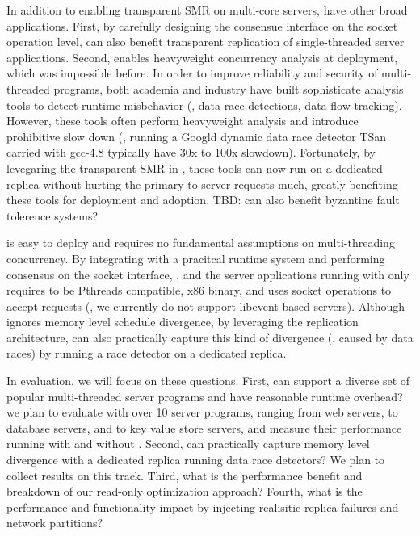 In addition to enabling transparent SMR on multi-core servers, \msmr have other 
broad applications. First, by carefully designing the consensue interface on 
the socket operation level, \msmr can also benefit transparent replication of 
single-threaded server applications. Second, \msmr enables heavyweight concurrency analysis at 
deployment, which was impossible before. In order to improve reliability and 
security of multi-threaded programs, both academia and industry have built 
sophisticate analysis tools to detect runtime misbehavior (\eg, data race detections, 
data flow tracking). However, these tools often perform heavyweight 
analysis and introduce prohibitive slow down (\eg, running a Googld dynamic data race detector 
TSan carried with gcc-4.8 typically have 30x to 100x slowdown). Fortunately, by 
levegaring the transparent SMR in \msmr, these tools can now run on a dedicated 
replica without hurting the primary to server requests much, greatly benefiting 
these tools for deployment and adoption. TBD: can \msmr also benefit byzantine fault 
tolerence systems?

\msmr is easy to deploy and requires no fundamental assumptions on multi-threading concurrency.
By integrating with a pracitcal \msmr runtime system \parrot and 
performing consensus on the socket interface, ,
and the server applications running with \msmr 
only requires to be Pthreads compatible, x86 binary, and uses socket operations 
to accept requests (\ie, we currently do not support libevent based servers). 
Although \parrot ignores memory level schedule divergence, by leveraging the replication architecture,
\msmr can also practically capture  this kind of divergence (\eg, caused by data races) by running a 
race detector on a dedicated replica.

In evaluation, we will focus on these questions. First, can \msmr support a diverse 
set of popular multi-threaded server programs and have reasonable runtime overhead? we plan to evaluate \msmr with 
over 10 server programs, ranging from web servers, to database servers, and to 
key value store servers, and measure their performance running with and without \msmr.
Second, can \msmr practically capture memory level divergence with a dedicated 
replica running data race detectors? We plan to collect results on this track. 
Third, what is the performance benefit and breakdown of our read-only 
optimization approach? Fourth, what is the performance and functionality impact 
by injecting realisitic replica failures and network partitions?


